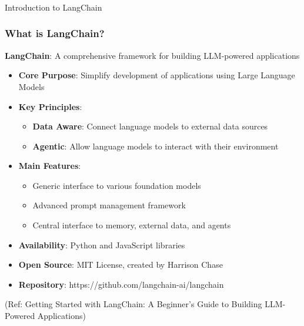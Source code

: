 \begin{frame}[fragile]\frametitle{}
\begin{center}
{\Large Introduction to LangChain}
\end{center}
\end{frame}

\begin{frame}\frametitle{What is LangChain?}

\textbf{LangChain}: A comprehensive framework for building LLM-powered applications

\begin{itemize}
\item \textbf{Core Purpose}: Simplify development of applications using Large Language Models
\item \textbf{Key Principles}:
    \begin{itemize}
    \item \textbf{Data Aware}: Connect language models to external data sources
    \item \textbf{Agentic}: Allow language models to interact with their environment
    \end{itemize}
\item \textbf{Main Features}:
    \begin{itemize}
    \item Generic interface to various foundation models
    \item Advanced prompt management framework
    \item Central interface to memory, external data, and agents
    \end{itemize}
\item \textbf{Availability}: Python and JavaScript libraries
\item \textbf{Open Source}: MIT License, created by Harrison Chase
\item \textbf{Repository}: https://github.com/langchain-ai/langchain
\end{itemize}

{\tiny (Ref: Getting Started with LangChain: A Beginner's Guide to Building LLM-Powered Applications)}
\end{frame}

